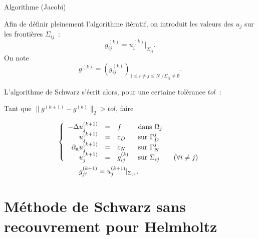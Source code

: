 \documentclass[
mode=present,    %
paper=a4paper,   %
orient=landscape,
display=slides,   %
size=10pt,
style=romain   %
]{powerdot}
\begin{document}
\begin{slide}[toc=Algorithme]{Algorithme (Jacobi)}

Afin de définir pleinement l'algorithme itératif, on introduit les
valeurs des $u_{j}$ sur les frontières $\Sigma_{ij}$~: 
$$
g_{ij}^{(k)} = u_{i}^{(k)}|_{\Sigma_{ij}}.
$$
On note
$$
g^{(k)} = \left(g_{ij}^{(k)}\right)_{1\leq i\neq j\leq N \;/ \Sigma_{ij}\neq\emptyset}.
$$

\bigskip
L'algorithme de Schwarz s'écrit alors, pour une certaine tolérance $tol$~:

Tant que $\|g^{(k+1)}-g^{(k)}\|_{2} > tol$, faire

\begin{equation}\label{eq:schwarzN}
\begin{array}{l}
\displaystyle{
\left\{\begin{array}{r c l l}
-\Delta u_{j}^{(k+1)} &=& f &\text{ dans } \Omega_{j}\\
u_{j}^{(k+1)} &=& c_{D} & \text{ sur }\Gamma_{D}^{j}\\
\partial_{\mathbf{n}}u_{j}^{(k+1)} &=& c_{N} & \text{ sur }\Gamma_{N}^{j}\\
u_{j}^{(k+1)} &=& g_{ij}^{(k)} & \text{ sur }\Sigma_{ij} \qquad (\forall i\neq j)\\
\end{array}\right.
}\\[1cm]
\qquad\quad g_{ji}^{(k+1)} = u_{j}^{(k+1)}|_{\Sigma_{ji}}.
\end{array}
\end{equation}

\end{slide}

\section[toc=Helmholtz sans overlap]{Méthode de Schwarz sans recouvrement pour
  Helmholtz}
\end{document}
